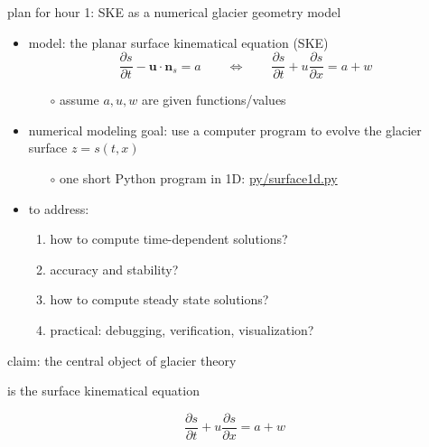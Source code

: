 \documentclass[10pt,dvipsnames]{beamer}
\newcommand{\bn}{\mathbf{n}}
\newcommand{\bu}{\mathbf{u}}
\begin{document}
\begin{frame}{plan for hour 1: SKE as a numerical glacier geometry model}

\begin{itemize}
\item \alert{model:} the planar surface kinematical equation (SKE)
\begin{equation*}
\frac{\partial s}{\partial t} - \bu \cdot \bn_s = a \qquad \iff \qquad \frac{\partial s}{\partial t} + u \frac{\partial s}{\partial x} = a + w
\end{equation*}

    \begin{itemize}
    \item[$\circ$] assume $a,u,w$ are given functions/values 
    \end{itemize}
\item \alert{numerical modeling goal:} use a computer program to evolve the glacier surface $z=s(t,x)$
    \begin{itemize}
    \item[$\circ$] one short Python program in 1D: \quad \href{https://github.com/bueler/mccarthy/blob/master/py/surface1d.py}{py/surface1d.py}
    \end{itemize}
\item \alert{to address:}
     \begin{enumerate}
     \item how to compute time-dependent solutions?
     \item accuracy and stability?
     \item how to compute steady state solutions?
     \item practical: debugging, verification, visualization?
     \end{enumerate}
\end{itemize}
\end{frame}


\begin{frame}[standout]
claim: the central object of glacier theory

is the surface kinematical equation

\begin{equation*}
\frac{\partial s}{\partial t} + u \frac{\partial s}{\partial x} = a + w
\end{equation*}
\end{frame}
\end{document}
